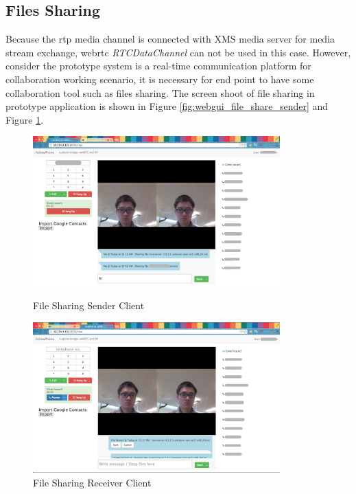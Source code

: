 \subsection{Files Sharing}

\par Because the \gls{rtp} media channel is connected with XMS media server for media  stream exchange, \gls{webrtc} \textit{RTCDataChannel} can not be used in this case. However, consider the prototype system is a real-time communication platform for collaboration working scenario, it is necessary for end point to have some collaboration tool such as files sharing. The screen shoot of file sharing in prototype application is shown in Figure \ref{fig:webgui_file_share_sender} and Figure \ref{fig:webgui_file_share_receiver}.

\begin{figure}
	\centering
    	\includegraphics[width=0.85\textwidth,natwidth=610,natheight=642]{figs/webgui_file_share_sender.png}
  	\caption{File Sharing Sender Client}
  	\label{fig:webgui_file_share_sender}
  	    \includegraphics[width=0.85\textwidth,natwidth=610,natheight=642]{figs/webgui_file_share_receiver.png}
  	\caption{File Sharing Receiver Client}
  	\label{fig:webgui_file_share_receiver}
\end{figure}


